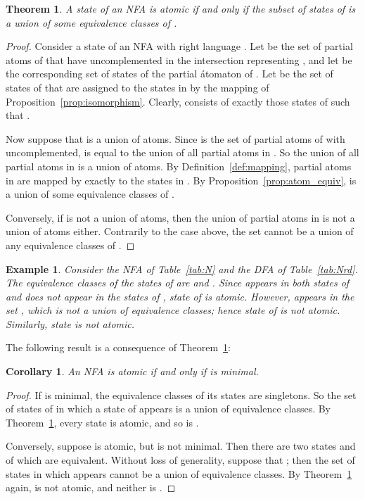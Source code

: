 \documentclass[preprint,12pt]{elsarticle}
\newcommand{\qedb}{\hfill}
\newtheorem{example}{Example}
\newtheorem{theorem}{Theorem}
\newtheorem{corollary}{Corollary}
\begin{document}
\begin{theorem}
\label{thm:atomic_state}
A state  of an NFA  is atomic if and only if 
the subset  of states of 
 is a union of some equivalence classes of .
\end{theorem}
\begin{proof}
Consider a state  of an NFA  with right language .
Let  be the set of partial atoms  of  
that have  uncomplemented in the intersection representing , and
let  be the corresponding set of states of the partial \'atomaton 
 of .
Let  be the set of states of  that are assigned to
the states in  by the mapping  of 
Proposition~\ref{prop:isomorphism}. Clearly,  consists of
exactly those states  of  such that . 

Now suppose that  is a union of atoms.
Since  is the set of partial atoms of  with  uncomplemented, 
 is equal to the union of all partial atoms in . 
So the union of all partial atoms in  is a union of atoms. 
By Definition~\ref{def:mapping}, partial atoms in  are 
mapped by  exactly to the states in . 
By Proposition~\ref{prop:atom_equiv},
 is a union of some equivalence classes of . 

Conversely, if  is not a union of atoms, then the union of 
partial atoms in  is not a union of atoms either. 
Contrarily to the case above, the set  cannot be a union of 
any equivalence classes of . 
\end{proof}

\begin{example}
\label{ex:atomic_state}
Consider the NFA  of Table~\ref{tab:N} and the DFA  of Table~\ref{tab:Nrd}. 
The equivalence classes of the states of  are 
 and . 
Since  appears in both states of  and does not appear in the states of , 
state  of  is atomic.
However,  appears in the set , which is not a union of 
equivalence classes; hence state  of  is not atomic. Similarly, state  
is not atomic.
\qedb
\end{example}

The following result is a consequence of Theorem~\ref{thm:atomic_state}:
\begin{corollary}
\label{cor:atomic}
An NFA  is atomic if and only if  is minimal. 
\end{corollary}
\begin{proof}
If  is minimal, the equivalence classes of its states  are singletons. 
So the set of states of   in which a state  of  appears is a union of equivalence classes.
By Theorem~\ref{thm:atomic_state},
every state is atomic, and  so is .

Conversely, suppose  is atomic, but  is not minimal.
Then there are two states  and  of   which are equivalent.
Without loss of generality, suppose that ; 
then the set of states in which  appears cannot be a union of equivalence classes. 
By Theorem~\ref{thm:atomic_state} again,  is not atomic, and neither is .
\end{proof}
\end{document}
